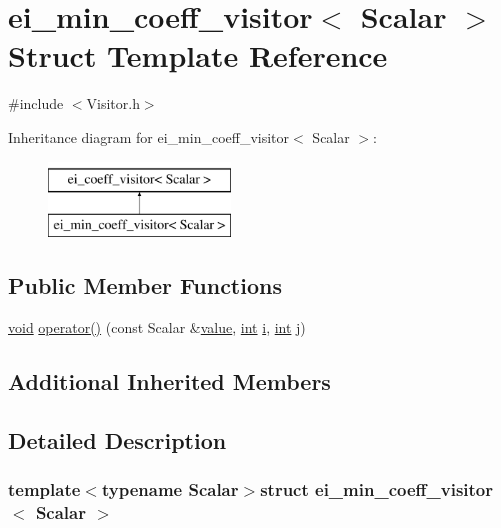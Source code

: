 \hypertarget{structei__min__coeff__visitor}{\section{ei\-\_\-min\-\_\-coeff\-\_\-visitor$<$ Scalar $>$ Struct Template Reference}
\label{structei__min__coeff__visitor}
}


{\ttfamily \#include $<$Visitor.\-h$>$}

Inheritance diagram for ei\-\_\-min\-\_\-coeff\-\_\-visitor$<$ Scalar $>$\-:\begin{figure}[H]
\begin{center}
\leavevmode
\includegraphics[height=2.000000cm]{structei__min__coeff__visitor}
\end{center}
\end{figure}
\subsection*{Public Member Functions}
\begin{DoxyCompactItemize}
\item 
\hyperlink{group___u_a_v_objects_plugin_ga444cf2ff3f0ecbe028adce838d373f5c}{void} \hyperlink{structei__min__coeff__visitor_abfcf1cec08d2bad24f1ed9d13c99809b}{operator()} (const Scalar \&\hyperlink{glext_8h_aa0e2e9cea7f208d28acda0480144beb0}{value}, \hyperlink{ioapi_8h_a787fa3cf048117ba7123753c1e74fcd6}{int} \hyperlink{uavobjecttemplate_8m_a6f6ccfcf58b31cb6412107d9d5281426}{i}, \hyperlink{ioapi_8h_a787fa3cf048117ba7123753c1e74fcd6}{int} j)
\end{DoxyCompactItemize}
\subsection*{Additional Inherited Members}


\subsection{Detailed Description}
\subsubsection*{template$<$typename Scalar$>$struct ei\-\_\-min\-\_\-coeff\-\_\-visitor$<$ Scalar $>$}



